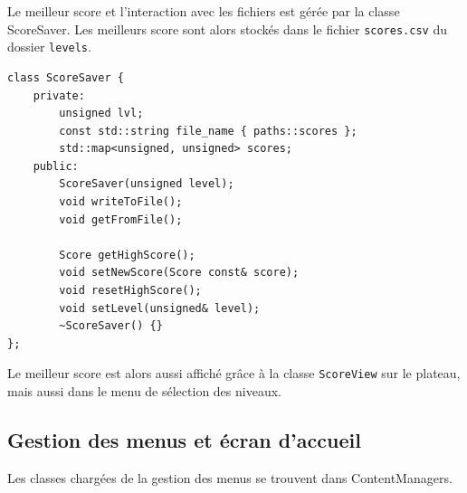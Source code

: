 \documentclass[a4paper, 12pt]{article}
\begin{document}
Le meilleur score et l'interaction avec les fichiers est gérée par la classe ScoreSaver.
Les meilleurs score sont alors stockés dans le fichier \texttt{scores.csv} du dossier
\texttt{levels}.

\begin{lstlisting}
class ScoreSaver {
    private:
        unsigned lvl;
        const std::string file_name { paths::scores };
        std::map<unsigned, unsigned> scores;
    public:
        ScoreSaver(unsigned level);
        void writeToFile();
        void getFromFile();

        Score getHighScore();
        void setNewScore(Score const& score);
        void resetHighScore();
        void setLevel(unsigned& level);
        ~ScoreSaver() {}
};
\end{lstlisting}

Le meilleur score est alors aussi affiché grâce à la classe \texttt{ScoreView} sur le plateau,
mais aussi dans le menu de sélection des niveaux.

\subsection{Gestion des menus et écran d'accueil}

Les classes chargées de la gestion des menus se trouvent dans ContentManagers.
\end{document}
